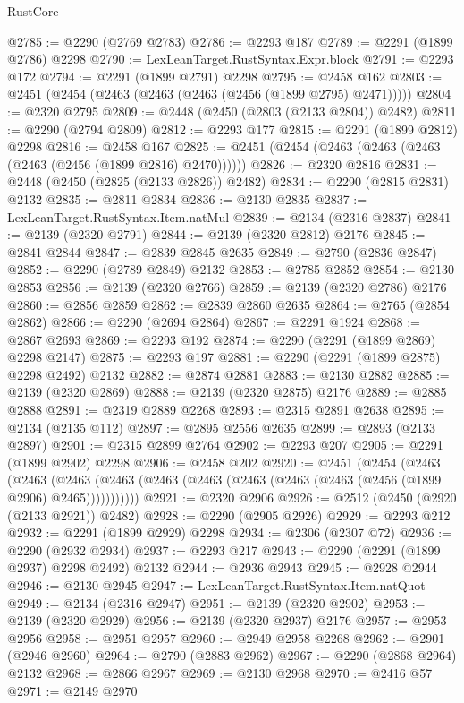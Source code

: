 \begin{lexlean}{RustCore}
\begin{coremodule}
@2785 := @2290 (@2769 @2783)
@2786 := @2293 @187
@2789 := @2291 (@1899 @2786) @2298
@2790 := LexLeanTarget.RustSyntax.Expr.block
@2791 := @2293 @172
@2794 := @2291 (@1899 @2791) @2298
@2795 := @2458 @162
@2803 := @2451 (@2454 (@2463 (@2463 (@2463 (@2456 (@1899 @2795) @2471)))))
@2804 := @2320 @2795
@2809 := @2448 (@2450 (@2803 (@2133 @2804)) @2482)
@2811 := @2290 (@2794 @2809)
@2812 := @2293 @177
@2815 := @2291 (@1899 @2812) @2298
@2816 := @2458 @167
@2825 := @2451 (@2454 (@2463 (@2463 (@2463 (@2463 (@2456 (@1899 @2816) @2470))))))
@2826 := @2320 @2816
@2831 := @2448 (@2450 (@2825 (@2133 @2826)) @2482)
@2834 := @2290 (@2815 @2831) @2132
@2835 := @2811 @2834
@2836 := @2130 @2835
@2837 := LexLeanTarget.RustSyntax.Item.natMul
@2839 := @2134 (@2316 @2837)
@2841 := @2139 (@2320 @2791)
@2844 := @2139 (@2320 @2812) @2176
@2845 := @2841 @2844
@2847 := @2839 @2845 @2635
@2849 := @2790 (@2836 @2847)
@2852 := @2290 (@2789 @2849) @2132
@2853 := @2785 @2852
@2854 := @2130 @2853
@2856 := @2139 (@2320 @2766)
@2859 := @2139 (@2320 @2786) @2176
@2860 := @2856 @2859
@2862 := @2839 @2860 @2635
@2864 := @2765 (@2854 @2862)
@2866 := @2290 (@2694 @2864)
@2867 := @2291 @1924
@2868 := @2867 @2693
@2869 := @2293 @192
@2874 := @2290 (@2291 (@1899 @2869) @2298 @2147)
@2875 := @2293 @197
@2881 := @2290 (@2291 (@1899 @2875) @2298 @2492) @2132
@2882 := @2874 @2881
@2883 := @2130 @2882
@2885 := @2139 (@2320 @2869)
@2888 := @2139 (@2320 @2875) @2176
@2889 := @2885 @2888
@2891 := @2319 @2889 @2268
@2893 := @2315 @2891 @2638
@2895 := @2134 (@2135 @112)
@2897 := @2895 @2556 @2635
@2899 := @2893 (@2133 @2897)
@2901 := @2315 @2899 @2764
@2902 := @2293 @207
@2905 := @2291 (@1899 @2902) @2298
@2906 := @2458 @202
@2920 := @2451
    (@2454
      (@2463
        (@2463
          (@2463 (@2463 (@2463 (@2463 (@2463 (@2463 (@2463 (@2456 (@1899 @2906) @2465)))))))))))
@2921 := @2320 @2906
@2926 := @2512 (@2450 (@2920 (@2133 @2921)) @2482)
@2928 := @2290 (@2905 @2926)
@2929 := @2293 @212
@2932 := @2291 (@1899 @2929) @2298
@2934 := @2306 (@2307 @72)
@2936 := @2290 (@2932 @2934)
@2937 := @2293 @217
@2943 := @2290 (@2291 (@1899 @2937) @2298 @2492) @2132
@2944 := @2936 @2943
@2945 := @2928 @2944
@2946 := @2130 @2945
@2947 := LexLeanTarget.RustSyntax.Item.natQuot
@2949 := @2134 (@2316 @2947)
@2951 := @2139 (@2320 @2902)
@2953 := @2139 (@2320 @2929)
@2956 := @2139 (@2320 @2937) @2176
@2957 := @2953 @2956
@2958 := @2951 @2957
@2960 := @2949 @2958 @2268
@2962 := @2901 (@2946 @2960)
@2964 := @2790 (@2883 @2962)
@2967 := @2290 (@2868 @2964) @2132
@2968 := @2866 @2967
@2969 := @2130 @2968
@2970 := @2416 @57
@2971 := @2149 @2970

\end{coremodule}
\end{lexlean}
